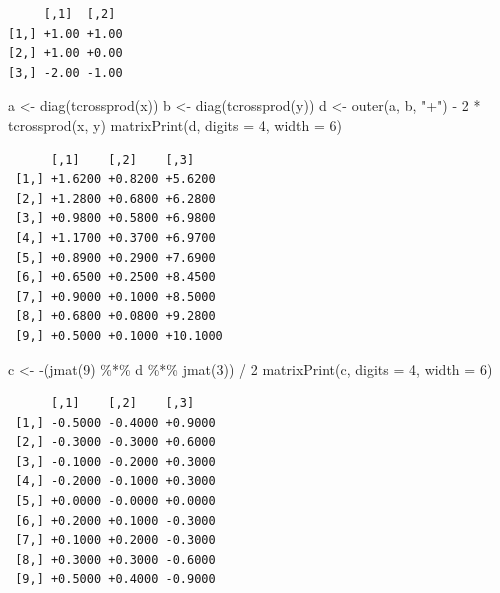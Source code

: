 \documentclass[
  12pt,
  letterpaper,
  DIV=11,
  numbers=noendperiod]{scrartcl}
\newenvironment{Shaded}{\begin{snugshade}}{\end{snugshade}}
\newcommand{\AttributeTok}[1]{\textcolor[rgb]{0.40,0.45,0.13}{#1}}
\newcommand{\DecValTok}[1]{\textcolor[rgb]{0.68,0.00,0.00}{#1}}
\newcommand{\FunctionTok}[1]{\textcolor[rgb]{0.28,0.35,0.67}{#1}}
\newcommand{\NormalTok}[1]{\textcolor[rgb]{0.00,0.23,0.31}{#1}}
\newcommand{\OtherTok}[1]{\textcolor[rgb]{0.00,0.23,0.31}{#1}}
\newcommand{\SpecialCharTok}[1]{\textcolor[rgb]{0.37,0.37,0.37}{#1}}
\newcommand{\StringTok}[1]{\textcolor[rgb]{0.13,0.47,0.30}{#1}}
\begin{document}
\begin{verbatim}
     [,1]  [,2] 
[1,] +1.00 +1.00
[2,] +1.00 +0.00
[3,] -2.00 -1.00
\end{verbatim}

\begin{Shaded}
\begin{Highlighting}[]
\NormalTok{a }\OtherTok{\textless{}{-}} \FunctionTok{diag}\NormalTok{(}\FunctionTok{tcrossprod}\NormalTok{(x))}
\NormalTok{b }\OtherTok{\textless{}{-}} \FunctionTok{diag}\NormalTok{(}\FunctionTok{tcrossprod}\NormalTok{(y))}
\NormalTok{d }\OtherTok{\textless{}{-}} \FunctionTok{outer}\NormalTok{(a, b, }\StringTok{"+"}\NormalTok{) }\SpecialCharTok{{-}} \DecValTok{2} \SpecialCharTok{*} \FunctionTok{tcrossprod}\NormalTok{(x, y)}
\FunctionTok{matrixPrint}\NormalTok{(d, }\AttributeTok{digits =} \DecValTok{4}\NormalTok{, }\AttributeTok{width =} \DecValTok{6}\NormalTok{)}
\end{Highlighting}
\end{Shaded}

\begin{verbatim}
      [,1]    [,2]    [,3]    
 [1,] +1.6200 +0.8200 +5.6200 
 [2,] +1.2800 +0.6800 +6.2800 
 [3,] +0.9800 +0.5800 +6.9800 
 [4,] +1.1700 +0.3700 +6.9700 
 [5,] +0.8900 +0.2900 +7.6900 
 [6,] +0.6500 +0.2500 +8.4500 
 [7,] +0.9000 +0.1000 +8.5000 
 [8,] +0.6800 +0.0800 +9.2800 
 [9,] +0.5000 +0.1000 +10.1000
\end{verbatim}

\begin{Shaded}
\begin{Highlighting}[]
\NormalTok{c }\OtherTok{\textless{}{-}} \SpecialCharTok{{-}}\NormalTok{(}\FunctionTok{jmat}\NormalTok{(}\DecValTok{9}\NormalTok{) }\SpecialCharTok{\%*\%}\NormalTok{ d }\SpecialCharTok{\%*\%} \FunctionTok{jmat}\NormalTok{(}\DecValTok{3}\NormalTok{)) }\SpecialCharTok{/} \DecValTok{2}
\FunctionTok{matrixPrint}\NormalTok{(c, }\AttributeTok{digits =} \DecValTok{4}\NormalTok{, }\AttributeTok{width =} \DecValTok{6}\NormalTok{)}
\end{Highlighting}
\end{Shaded}

\begin{verbatim}
      [,1]    [,2]    [,3]   
 [1,] -0.5000 -0.4000 +0.9000
 [2,] -0.3000 -0.3000 +0.6000
 [3,] -0.1000 -0.2000 +0.3000
 [4,] -0.2000 -0.1000 +0.3000
 [5,] +0.0000 -0.0000 +0.0000
 [6,] +0.2000 +0.1000 -0.3000
 [7,] +0.1000 +0.2000 -0.3000
 [8,] +0.3000 +0.3000 -0.6000
 [9,] +0.5000 +0.4000 -0.9000
\end{verbatim}
\end{document}

